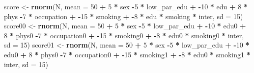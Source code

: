 \documentclass[
]{book}
\newenvironment{Shaded}{\begin{snugshade}}{\end{snugshade}}
\newcommand{\AttributeTok}[1]{\textcolor[rgb]{0.13,0.29,0.53}{#1}}
\newcommand{\DecValTok}[1]{\textcolor[rgb]{0.00,0.00,0.81}{#1}}
\newcommand{\FunctionTok}[1]{\textcolor[rgb]{0.13,0.29,0.53}{\textbf{#1}}}
\newcommand{\NormalTok}[1]{#1}
\newcommand{\OtherTok}[1]{\textcolor[rgb]{0.56,0.35,0.01}{#1}}
\newcommand{\SpecialCharTok}[1]{\textcolor[rgb]{0.81,0.36,0.00}{\textbf{#1}}}
\begin{document}
\begin{Shaded}
\begin{Highlighting}[]
\NormalTok{  score }\OtherTok{\textless{}{-}} \FunctionTok{rnorm}\NormalTok{(N, }\AttributeTok{mean =} \DecValTok{50} \SpecialCharTok{+} \DecValTok{5} \SpecialCharTok{*}\NormalTok{ sex  }\SpecialCharTok{{-}}\DecValTok{5} \SpecialCharTok{*}\NormalTok{ low\_par\_edu }\SpecialCharTok{+} 
                   \SpecialCharTok{{-}}\DecValTok{10} \SpecialCharTok{*}\NormalTok{ edu }\SpecialCharTok{+} \DecValTok{8} \SpecialCharTok{*}\NormalTok{ phys }\SpecialCharTok{{-}}\DecValTok{7} \SpecialCharTok{*}\NormalTok{ occupation }\SpecialCharTok{+} 
                   \SpecialCharTok{{-}}\DecValTok{15} \SpecialCharTok{*}\NormalTok{ smoking }\SpecialCharTok{+} \SpecialCharTok{{-}}\DecValTok{8} \SpecialCharTok{*}\NormalTok{ edu }\SpecialCharTok{*}\NormalTok{ smoking }\SpecialCharTok{*}\NormalTok{ inter, }
                 \AttributeTok{sd =} \DecValTok{15}\NormalTok{)}
\NormalTok{  score00 }\OtherTok{\textless{}{-}} \FunctionTok{rnorm}\NormalTok{(N, }\AttributeTok{mean =} \DecValTok{50} \SpecialCharTok{+} \DecValTok{5} \SpecialCharTok{*}\NormalTok{ sex  }\SpecialCharTok{{-}}\DecValTok{5} \SpecialCharTok{*}\NormalTok{ low\_par\_edu }\SpecialCharTok{+} 
                     \SpecialCharTok{{-}}\DecValTok{10} \SpecialCharTok{*}\NormalTok{ edu0 }\SpecialCharTok{+} \DecValTok{8} \SpecialCharTok{*}\NormalTok{ phys0 }\SpecialCharTok{{-}}\DecValTok{7} \SpecialCharTok{*}\NormalTok{ occupation0 }\SpecialCharTok{+} 
                     \SpecialCharTok{{-}}\DecValTok{15} \SpecialCharTok{*}\NormalTok{ smoking0 }\SpecialCharTok{+} \SpecialCharTok{{-}}\DecValTok{8} \SpecialCharTok{*}\NormalTok{ edu0 }\SpecialCharTok{*}\NormalTok{ smoking0 }\SpecialCharTok{*}\NormalTok{ inter,}
                   \AttributeTok{sd =} \DecValTok{15}\NormalTok{)}
\NormalTok{  score01 }\OtherTok{\textless{}{-}} \FunctionTok{rnorm}\NormalTok{(N, }\AttributeTok{mean =} \DecValTok{50} \SpecialCharTok{+} \DecValTok{5} \SpecialCharTok{*}\NormalTok{ sex  }\SpecialCharTok{{-}}\DecValTok{5} \SpecialCharTok{*}\NormalTok{ low\_par\_edu }\SpecialCharTok{+} 
                     \SpecialCharTok{{-}}\DecValTok{10} \SpecialCharTok{*}\NormalTok{ edu0 }\SpecialCharTok{+} \DecValTok{8} \SpecialCharTok{*}\NormalTok{ phys0 }\SpecialCharTok{{-}}\DecValTok{7} \SpecialCharTok{*}\NormalTok{ occupation0 }\SpecialCharTok{+} 
                     \SpecialCharTok{{-}}\DecValTok{15} \SpecialCharTok{*}\NormalTok{ smoking1 }\SpecialCharTok{+} \SpecialCharTok{{-}}\DecValTok{8} \SpecialCharTok{*}\NormalTok{ edu0 }\SpecialCharTok{*}\NormalTok{ smoking1 }\SpecialCharTok{*}\NormalTok{ inter,}
                   \AttributeTok{sd =} \DecValTok{15}\NormalTok{)  }

\end{Highlighting}
\end{Shaded}
\end{document}
